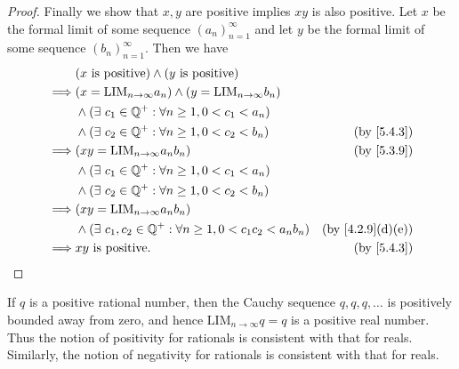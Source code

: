 \begin{proof}
  Finally we show that \(x, y\) are positive implies \(xy\) is also positive.
  Let \(x\) be the formal limit of some sequence \((a_n)_{n = 1}^{\infty}\) and let \(y\) be the formal limit of some sequence \((b_n)_{n = 1}^{\infty}\).
  Then we have
  \begin{align*}
             & (x \text{ is positive}) \land (y \text{ is positive})                                                          \\
    \implies & (x = \text{LIM}_{n \to \infty} a_n) \land (y = \text{LIM}_{n \to \infty} b_n)                                  \\
             & \land (\exists\ c_1 \in \Q^+ : \forall n \geq 1, 0 < c_1 < a_n)                                                \\
             & \land (\exists\ c_2 \in \Q^+ : \forall n \geq 1, 0 < c_2 < b_n)               & \text{(by \cref{5.4.3})}       \\
    \implies & (xy = \text{LIM}_{n \to \infty} a_n b_n)                                      & \text{(by \cref{5.3.9})}       \\
             & \land (\exists\ c_1 \in \Q^+ : \forall n \geq 1, 0 < c_1 < a_n)                                                \\
             & \land (\exists\ c_2 \in \Q^+ : \forall n \geq 1, 0 < c_2 < b_n)                                                \\
    \implies & (xy = \text{LIM}_{n \to \infty} a_n b_n)                                                                       \\
             & \land (\exists\ c_1, c_2 \in \Q^+ : \forall n \geq 1, 0 < c_1 c_2 < a_n b_n)  & \text{(by \cref{4.2.9}(d)(e))} \\
    \implies & xy \text{ is positive}.                                                       & \text{(by \cref{5.4.3})}
  \end{align*}
\end{proof}

\begin{note}
  If \(q\) is a positive rational number, then the Cauchy sequence \(q, q, q, \dots\) is positively bounded away from zero, and hence \(\text{LIM}_{n \to \infty} q = q\) is a positive real number.
  Thus the notion of positivity for rationals is consistent with that for reals.
  Similarly, the notion of negativity for rationals is consistent with that for reals.
\end{note}

